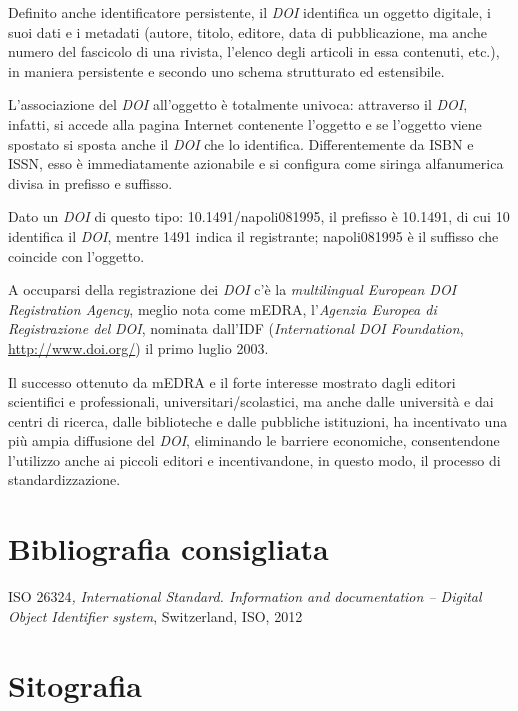 \documentclass[
  b5paper,
  twoside,
  12pt,
  chapterprefix=false,
  bibliography=totocnumbered,
  parskip=false]{scrbook}
\begin{document}
Definito anche identificatore persistente, il \emph{DOI} identifica un
oggetto digitale, i suoi dati e i metadati (autore, titolo, editore,
data di pubblicazione, ma anche numero del fascicolo di una rivista,
l'elenco degli articoli in essa contenuti, etc.), in maniera persistente
e secondo uno schema strutturato ed estensibile.

L'associazione del \emph{DOI} all'oggetto è totalmente univoca: attraverso il
\emph{DOI}, infatti, si accede alla pagina Internet contenente l'oggetto e se
l'oggetto viene spostato si sposta anche il \emph{DOI} che lo identifica.
Differentemente da ISBN e ISSN, esso è immediatamente azionabile e si
configura come siringa alfanumerica divisa in prefisso e suffisso.

Dato un \emph{DOI} di questo tipo: 10.1491/napoli081995, il prefisso è
10.1491, di cui 10 identifica il \emph{DOI}, mentre 1491 indica il
registrante; napoli081995 è il suffisso che coincide con l'oggetto.

A occuparsi della registrazione dei \emph{DOI} c'è la \emph{multilingual European
DOI Registration Agency}, meglio nota come mEDRA, l'\emph{Agenzia Europea di
Registrazione del} \emph{DOI}, nominata dall'IDF (\emph{International DOI
Foundation}, \url{http://www.doi.org/}) il primo
luglio 2003.

Il successo ottenuto da mEDRA e il forte interesse mostrato dagli
editori scientifici e professionali, universitari/scolastici, ma anche
dalle università e dai centri di ricerca, dalle biblioteche e dalle
pubbliche istituzioni, ha incentivato una più ampia diffusione del
\emph{DOI}, eliminando le barriere economiche, consentendone l'utilizzo anche
ai piccoli editori e incentivandone, in questo modo, il processo di
standardizzazione.

\hypertarget{bibliografia-consigliata-7}{%
\section*{Bibliografia consigliata}\label{bibliografia-consigliata-7}}

ISO 26324\emph{,} \emph{International Standard. Information and documentation --
Digital Object Identifier system}, Switzerland, ISO, 2012

\hypertarget{sitografia-9}{%
\section*{Sitografia}\label{sitografia-9}}
\end{document}
